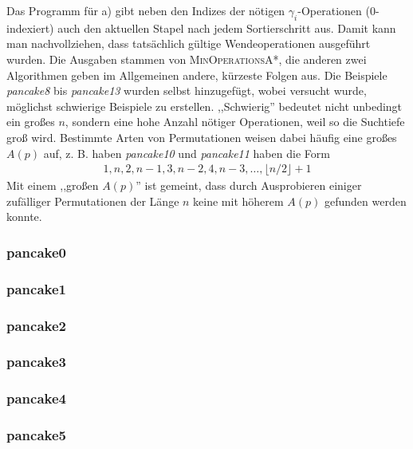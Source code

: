 \documentclass[a4paper, 10pt, ngerman]{article}
\begin{document}
Das Programm für a) gibt neben den Indizes der nötigen $\gamma_i$-Operationen (0-indexiert) auch den aktuellen Stapel nach jedem Sortierschritt aus. Damit kann man nachvollziehen, dass tatsächlich gültige Wendeoperationen ausgeführt wurden. Die Ausgaben stammen von \textsc{MinOperationsA*}, die anderen zwei Algorithmen geben im Allgemeinen andere, kürzeste Folgen aus. Die Beispiele \emph{pancake8} bis \emph{pancake13} wurden selbst hinzugefügt, wobei versucht wurde, möglichst schwierige Beispiele zu erstellen. ,,Schwierig'' bedeutet nicht unbedingt ein großes $n$, sondern eine hohe Anzahl nötiger Operationen, weil so die Suchtiefe groß wird. Bestimmte Arten von Permutationen weisen dabei häufig eine großes $A(p)$ auf, z. B. haben \emph{pancake10} und \emph{pancake11} haben die Form
\begin{align*}
    1, n, 2, n - 1, 3, n - 2, 4, n - 3, \dots, \lfloor n/2 \rfloor + 1
\end{align*}
Mit einem ,,großen $A(p)$'' ist gemeint, dass durch Ausprobieren einiger zufälliger Permutationen der Länge $n$ keine mit höherem $A(p)$ gefunden werden konnte.

\subsubsection{pancake0}


\subsubsection{pancake1}


\subsubsection{pancake2}


\subsubsection{pancake3}


\subsubsection{pancake4}


\subsubsection{pancake5}

\end{document}
